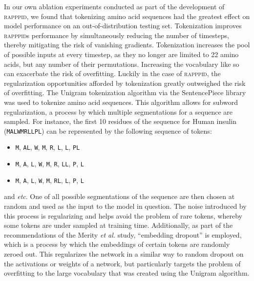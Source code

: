 
In our own ablation experiments conducted as part of the development of \textsc{rapppid}, we found that tokenizing amino acid sequences had the greatest effect on model performance on an out-of-distribution testing set. Tokenization improves \textsc{rapppid}s performance by simultaneously reducing the number of timesteps, thereby mitigating the risk of vanishing gradients. Tokenization increases the pool of possible inputs at every timestep, as they no longer are limited to 22 amino acids, but any number of their permutations. Increasing the vocabulary like so can exacerbate the risk of overfitting. Luckily in the case of \textsc{rapppid}, the regularization opportunities afforded by tokenization greatly outweighed the risk of overfitting. The Unigram tokenization algorithm via the SentencePiece library was used to tokenize amino acid sequences. This algorithm allows for subword regularization, a process by which multiple segmentations for a sequence are sampled. For instance, the first 10 residues of the sequence for Human insulin (\texttt{MALWMRLLPL}) can be represented by the following sequence of tokens:
\begin{itemize}
    \item{\texttt{M}, \texttt{AL}, \texttt{W}, \texttt{M}, \texttt{R}, \texttt{L}, \texttt{L}, \texttt{PL}}
    \item{\texttt{M}, \texttt{A}, \texttt{L}, \texttt{W}, \texttt{M}, \texttt{R}, \texttt{LL}, \texttt{P}, \texttt{L}}
    \item{\texttt{M}, \texttt{A}, \texttt{L}, \texttt{W}, \texttt{M}, \texttt{RL}, \texttt{L}, \texttt{P}, \texttt{L}}
\end{itemize}
and \textit{etc}. One of all possible segmentations of the sequence are then chosen at random and used as the input to the model in question. The noise introduced by this process is regularizing and helps avoid the problem of rare tokens, whereby some tokens are under sampled at training time. Additionally, as part of the recommendations of the Merity \textit{et al.} study, ``embedding dropout'' is employed, which is a process by which the embeddings of certain tokens are randomly zeroed out. This regularizes the network in a similar way to random dropout on the activations or weights of a network, but particularly targets the problem of overfitting to the large vocabulary that was created using the Unigram algorithm.

